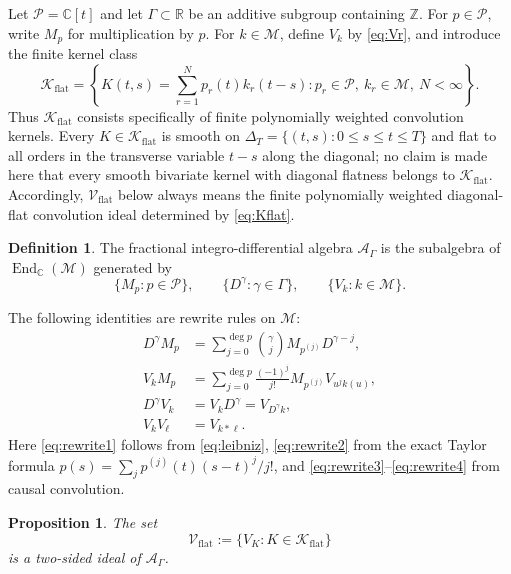 \documentclass[11pt]{article}
\numberwithin{equation}{section}
\newtheorem{proposition}{Proposition}
\theoremstyle{definition}
\newtheorem{definition}{Definition}
\theoremstyle{remark}
\newcommand{\C}{\mathbb C}
\newcommand{\R}{\mathbb R}
\newcommand{\Z}{\mathbb Z}
\newcommand{\M}{\mathcal M}
\newcommand{\A}{\mathcal A}
\newcommand{\Pcal}{\mathcal P}
\newcommand{\Vflat}{\mathcal V_{\mathrm{flat}}}
\newcommand{\Kflat}{\mathcal K_{\mathrm{flat}}}
\begin{document}
Let $\Pcal=\C[t]$ and let $\Gamma\subset\R$ be an additive subgroup containing $\Z$. For $p\in\Pcal$, write $M_p$ for multiplication by $p$. For $k\in\M$, define $V_k$ by \eqref{eq:Vr}, and introduce the finite kernel class
\begin{equation}
\Kflat=\left\{K(t,s)=\sum_{r=1}^{N}p_r(t)k_r(t-s):p_r\in\Pcal,\ k_r\in\M,\ N<\infty\right\}.
\label{eq:Kflat}
\end{equation}
Thus $\Kflat$ consists specifically of finite polynomially weighted convolution kernels. Every $K\in\Kflat$ is smooth on $\Delta_T=\{(t,s):0\le s\le t\le T\}$ and flat to all orders in the transverse variable $t-s$ along the diagonal; no claim is made here that every smooth bivariate kernel with diagonal flatness belongs to $\Kflat$. Accordingly, $\Vflat$ below always means the finite polynomially weighted diagonal-flat convolution ideal determined by \eqref{eq:Kflat}.

\begin{definition}
The fractional integro-differential algebra $\A_\Gamma$ is the subalgebra of $\operatorname{End}_{\C}(\M)$ generated by
\begin{equation*}
\{M_p:p\in\Pcal\},
\qquad \{D^\gamma:\gamma\in\Gamma\},
\qquad \{V_k:k\in\M\}.
\end{equation*}
\end{definition}

The following identities are rewrite rules on $\M$:
\begin{align}
D^\gamma M_p&=\sum_{j=0}^{\deg p}\binom{\gamma}{j}M_{p^{(j)}}D^{\gamma-j},
\label{eq:rewrite1}\\
V_kM_p&=\sum_{j=0}^{\deg p}\frac{(-1)^j}{j!}M_{p^{(j)}}V_{u^jk(u)},
\label{eq:rewrite2}\\
D^\gamma V_k&=V_kD^\gamma=V_{D^\gamma k},
\label{eq:rewrite3}\\
V_kV_\ell&=V_{k*\ell}.
\label{eq:rewrite4}
\end{align}
Here \eqref{eq:rewrite1} follows from \eqref{eq:leibniz}, \eqref{eq:rewrite2} from the exact Taylor formula $p(s)=\sum_jp^{(j)}(t)(s-t)^j/j!$, and \eqref{eq:rewrite3}--\eqref{eq:rewrite4} from causal convolution.

\begin{proposition}\label{prop:ideal}
The set
\begin{equation*}
\Vflat:=\{V_K:K\in\Kflat\}
\end{equation*}
is a two-sided ideal of $\A_\Gamma$.
\end{proposition}
\end{document}
